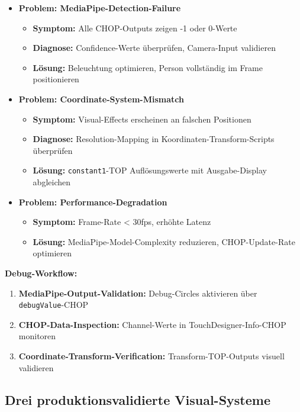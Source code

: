 \begin{itemize}
    \item \textbf{Problem: MediaPipe-Detection-Failure}
    \begin{itemize}
        \item \textbf{Symptom:} Alle CHOP-Outputs zeigen -1 oder 0-Werte
        \item \textbf{Diagnose:} Confidence-Werte überprüfen, Camera-Input validieren
        \item \textbf{Lösung:} Beleuchtung optimieren, Person vollständig im Frame positionieren
    \end{itemize}
    
    \item \textbf{Problem: Coordinate-System-Mismatch}
    \begin{itemize}
        \item \textbf{Symptom:} Visual-Effects erscheinen an falschen Positionen
        \item \textbf{Diagnose:} Resolution-Mapping in Koordinaten-Transform-Scripts überprüfen
        \item \textbf{Lösung:} \texttt{constant1}-TOP Auflösungswerte mit Ausgabe-Display abgleichen
    \end{itemize}
    
    \item \textbf{Problem: Performance-Degradation}
    \begin{itemize}
        \item \textbf{Symptom:} Frame-Rate < 30fps, erhöhte Latenz
        \item \textbf{Lösung:} MediaPipe-Model-Complexity reduzieren, CHOP-Update-Rate optimieren
    \end{itemize}
\end{itemize}

\textbf{Debug-Workflow:}
\begin{enumerate}
    \item \textbf{MediaPipe-Output-Validation:} Debug-Circles aktivieren über \texttt{debugValue}-CHOP
    \item \textbf{CHOP-Data-Inspection:} Channel-Werte in TouchDesigner-Info-CHOP monitoren
    \item \textbf{Coordinate-Transform-Verification:} Transform-TOP-Outputs visuell validieren
\end{enumerate}

\newpage

\subsection{Drei produktionsvalidierte Visual-Systeme}

